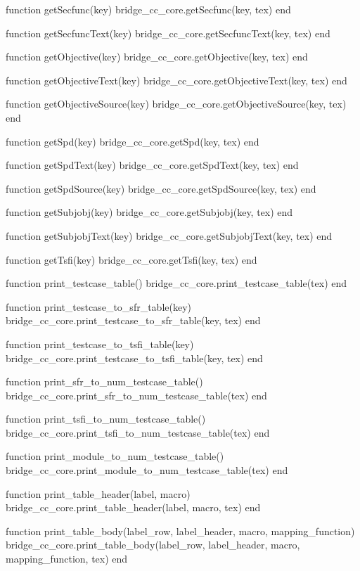 \begin{luacode}
  function getSecfunc(key)
    bridge_cc_core.getSecfunc(key, tex)
  end

  function getSecfuncText(key)
    bridge_cc_core.getSecfuncText(key, tex)
  end

  function getObjective(key)
    bridge_cc_core.getObjective(key, tex)
  end

  function getObjectiveText(key)
    bridge_cc_core.getObjectiveText(key, tex)
  end

  function getObjectiveSource(key)
    bridge_cc_core.getObjectiveSource(key, tex)
  end

  function getSpd(key)
    bridge_cc_core.getSpd(key, tex)
  end

  function getSpdText(key)
    bridge_cc_core.getSpdText(key, tex)
  end

  function getSpdSource(key)
    bridge_cc_core.getSpdSource(key, tex)
  end

  function getSubjobj(key)
    bridge_cc_core.getSubjobj(key, tex)
  end

  function getSubjobjText(key)
    bridge_cc_core.getSubjobjText(key, tex)
  end

  function getTsfi(key)
    bridge_cc_core.getTsfi(key, tex)
  end

  function print_testcase_table()
    bridge_cc_core.print_testcase_table(tex)
  end

  function print_testcase_to_sfr_table(key)
    bridge_cc_core.print_testcase_to_sfr_table(key, tex)
  end

  function print_testcase_to_tsfi_table(key)
    bridge_cc_core.print_testcase_to_tsfi_table(key, tex)
  end

  function print_sfr_to_num_testcase_table()
    bridge_cc_core.print_sfr_to_num_testcase_table(tex)
  end

  function print_tsfi_to_num_testcase_table()
    bridge_cc_core.print_tsfi_to_num_testcase_table(tex)
  end

  function print_module_to_num_testcase_table()
    bridge_cc_core.print_module_to_num_testcase_table(tex)
  end

  function print_table_header(label, macro)
    bridge_cc_core.print_table_header(label, macro, tex)
  end

  function print_table_body(label_row, label_header, macro, mapping_function)
    bridge_cc_core.print_table_body(label_row, label_header, macro, mapping_function, tex)
  end

\end{luacode}
